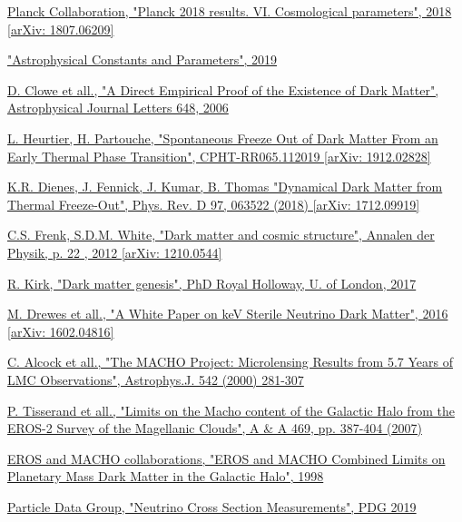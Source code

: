 \documentclass[a4paper, 10pt, openright]{report}
\begin{document}
\begin{thebibliography}{1}
\href{https://arxiv.org/abs/1807.06209}{Planck Collaboration, 
"Planck 2018 results. VI. Cosmological parameters", 2018 [arXiv: 1807.06209]
}

\href{http://pdg.lbl.gov/2019/reviews/rpp2018-rev-astrophysical-constants.pdf}{
"Astrophysical Constants and Parameters", 
2019
}

\href{https://iopscience.iop.org/article/10.1086/508162}{D. Clowe et all.,
"A Direct Empirical Proof of the Existence of Dark Matter",
Astrophysical Journal Letters 648, 2006
}

\href{https://arxiv.org/abs/1912.02828}{L. Heurtier, H. Partouche,
"Spontaneous Freeze Out of Dark Matter From an Early Thermal Phase Transition",
CPHT-RR065.112019 [arXiv: 1912.02828]}

\href{https://arxiv.org/pdf/1712.09919.pdf}{K.R. Dienes, J. Fennick, J. Kumar, B. Thomas
"Dynamical Dark Matter from Thermal Freeze-Out",
Phys. Rev. D 97, 063522 (2018) [arXiv: 1712.09919]
}

\href{https://arxiv.org/pdf/1210.0544.pdf}{C.S. Frenk, S.D.M. White,
"Dark matter and cosmic structure",
Annalen der Physik, p. 22 , 2012 [arXiv: 1210.0544]
}

\href{http://inspirehep.net/record/1683379/files/fulltext.pdf}{R. Kirk,
"Dark matter genesis", PhD Royal Holloway, U. of London, 2017}

\href{https://arxiv.org/pdf/1602.04816.pdf}{M. Drewes et all.,
"A White Paper on keV Sterile Neutrino Dark Matter",
2016 [arXiv: 1602.04816]
}

\href{https://arxiv.org/pdf/astro-ph/0001272}{C. Alcock et all.,
"The MACHO Project: Microlensing Results from 5.7 Years of LMC Observations",
	Astrophys.J. 542 (2000) 281-307
}

\href{https://www.aanda.org/articles/aa/pdf/2007/26/aa6017-06.pdf}{P. Tisserand et all.,
"Limits on the Macho content of the Galactic Halo from the EROS-2 Survey of the Magellanic Clouds",
A \& A 469, pp. 387-404 (2007)
}

\href{https://arxiv.org/abs/astro-ph/9803082}{EROS and MACHO collaborations,
"EROS and MACHO Combined Limits on Planetary Mass Dark Matter in the Galactic Halo",
1998
}

\href{http://pdg.lbl.gov/2019/reviews/rpp2018-rev-nu-cross-sections.pdf}{Particle Data Group,
"Neutrino Cross Section Measurements",
PDG 2019
}


\end{thebibliography}
\end{document}
